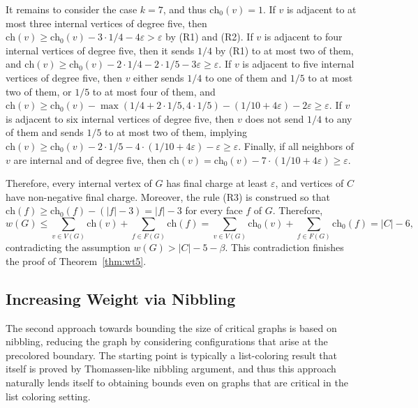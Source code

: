 \documentclass[12pt,twoside,openright,a4paper]{book}
\newcommand{\initch}{\text{ch}_0}
\newcommand{\finch}{\text{ch}}
\begin{document}
It remains to consider the case $k=7$, and thus $\initch(v)=1$.  If $v$ is adjacent to at most three internal vertices of degree five,
then $\finch(v)\ge \initch(v)-3\cdot 1/4-4\varepsilon>\varepsilon$ by (R1) and (R2).  If $v$ is adjacent to four internal vertices
of degree five, then it sends $1/4$ by (R1) to at most two of them, and
$\finch(v)\ge \initch(v)-2\cdot 1/4-2\cdot 1/5-3\varepsilon\ge\varepsilon$.  If $v$ is adjacent to five internal vertices of degree five,
then $v$ either sends $1/4$ to one of them and $1/5$ to at most two of them, or $1/5$ to at most four of them, and
$\finch(v)\ge \initch(v)-\max(1/4+2\cdot 1/5, 4\cdot 1/5)-(1/10+4\varepsilon)-2\varepsilon\ge \varepsilon$.
If $v$ is adjacent to six internal vertices of degree five, then $v$ does not send $1/4$ to any of them and sends $1/5$ to at most two of them,
implying $\finch(v)\ge \initch(v)-2\cdot 1/5-4\cdot(1/10+4\varepsilon)-\varepsilon\ge\varepsilon$.
Finally, if all neighbors of $v$ are internal and of degree five, then
$\finch(v)=\initch(v)-7\cdot(1/10+4\varepsilon)\ge\varepsilon$.

Therefore, every internal vertex of $G$ has final charge at least $\varepsilon$, and vertices of $C$ have non-negative final charge.
Moreover, the rule (R3) is construed so that $\finch(f)\ge \initch(f)-(|f|-3)=|f|-3$ for every face $f$ of $G$.
Therefore,
$$w(G)\le \sum_{v\in V(G)} \finch(v)+\sum_{f\in F(G)} \finch(f)=\sum_{v\in V(G)} \initch(v)+\sum_{f\in F(G)} \initch(f)=|C|-6,$$
contradicting the assumption $w(G)>|C|-5-\beta$.  This contradiction finishes the proof of Theorem~\ref{thm:wt5}.

\subsection{Increasing Weight via Nibbling}

The second approach towards bounding the size of critical graphs is based on nibbling,
reducing the graph by considering configurations that arise at the precolored boundary.
The starting point is typically a list-coloring result that itself is proved by Thomassen-like nibbling
argument, and thus this approach naturally lends itself to obtaining bounds even on graphs that are
critical in the list coloring setting.
\end{document}
